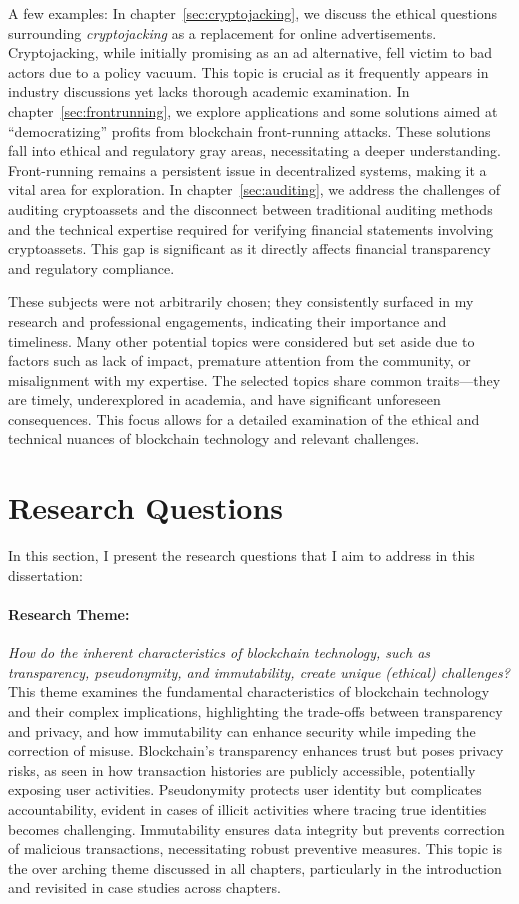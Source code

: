 A few examples: In chapter~\ref{sec:cryptojacking}, we discuss the ethical questions surrounding \textit{cryptojacking} as a replacement for online advertisements. Cryptojacking, while initially promising as an ad alternative, fell victim to bad actors due to a policy vacuum. This topic is crucial as it frequently appears in industry discussions yet lacks thorough academic examination. In chapter~\ref{sec:frontrunning}, we explore applications and some solutions aimed at ``democratizing'' profits from blockchain front-running attacks. These solutions fall into ethical and regulatory gray areas, necessitating a deeper understanding. Front-running remains a persistent issue in decentralized systems, making it a vital area for exploration. In chapter~\ref{sec:auditing}, we address the challenges of auditing cryptoassets and the disconnect between traditional auditing methods and the technical expertise required for verifying financial statements involving cryptoassets. This gap is significant as it directly affects financial transparency and regulatory compliance. 

These subjects were not arbitrarily chosen; they consistently surfaced in my research and professional engagements, indicating their importance and timeliness. Many other potential topics were considered but set aside due to factors such as lack of impact, premature attention from the community, or misalignment with my expertise. The selected topics share common traits—they are timely, underexplored in academia, and have significant unforeseen consequences. This focus allows for a detailed examination of the ethical and technical nuances of blockchain technology and relevant challenges.



\section{Research Questions}\label{sec:research_questions}
In this section, I present the research questions that I aim to address in this dissertation:

\paragraph{Research Theme:} \textit{How do the inherent characteristics of blockchain technology, such as transparency, pseudonymity, and immutability, create unique (ethical) challenges?} 
This theme examines the fundamental characteristics of blockchain technology and their complex implications, highlighting the trade-offs between transparency and privacy, and how immutability can enhance security while impeding the correction of misuse. Blockchain's transparency enhances trust but poses privacy risks, as seen in how transaction histories are publicly accessible, potentially exposing user activities. Pseudonymity protects user identity but complicates accountability, evident in cases of illicit activities where tracing true identities becomes challenging. Immutability ensures data integrity but prevents correction of malicious transactions, necessitating robust preventive measures. This topic is the over arching theme discussed in all chapters, particularly in the introduction and revisited in case studies across chapters.

